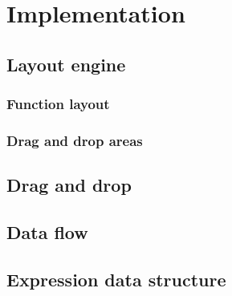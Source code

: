 \chapter{Implementation}

\section{Layout engine}
\subsection{Function layout}
\subsection{Drag and drop areas}
\section{Drag and drop}
\section{Data flow}
\section{Expression data structure}